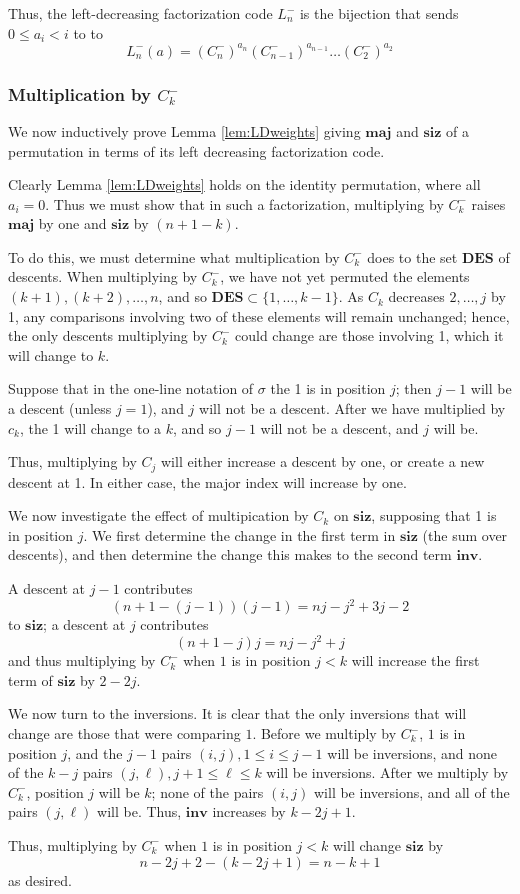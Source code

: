 \documentclass{amsart}[12pt]
\theoremstyle{definition}
\newcommand{\inv}{\mathbf{inv}}
\newcommand{\DES}{\mathbf{DES}}
\newcommand{\maj}{\mathbf{maj}}
\newcommand{\siz}{\mathbf{siz}}
\begin{document}
Thus, the left-decreasing factorization code $L^-_n$ is the bijection that sends $0\leq a_i<i$ to to 
$$L^-_n(a)=(C_n^-)^{a_n}(C_{n-1}^-)^{a_{n-1}}\dots (C_2^-)^{a_2}$$


\subsubsection{Multiplication by $C_k^-$} \label{sec:factorizationinductuction}

We now inductively prove Lemma \ref{lem:LDweights} giving $\maj$ and $\siz$ of a permutation in terms of its left decreasing factorization code.

Clearly Lemma \ref{lem:LDweights} holds on the identity permutation, where all $a_i=0$.   Thus we must show that in such a factorization, multiplying by $C^-_k$ raises $\maj$ by one and $\siz$ by $(n+1-k)$.

To do this, we must determine what multiplication by $C_k^-$ does to the set $\DES$ of descents.  When multiplying by $C^-_k$, we have not yet permuted the elements $(k+1), (k+2),\dots, n$, and so $\DES\subset \{1,\dots, k-1\}$. As $C_k$ decreases $2,\dots, j$ by 1, any comparisons involving two of these elements will remain unchanged; hence, the only descents multiplying by $C^-_k$ could change are those involving 1, which it will change to $k$.

Suppose that in the one-line notation of $\sigma$ the 1 is in position $j$; then $j-1$ will be a descent (unless $j=1$), and $j$ will not be a descent.  After we have multiplied by $c_k$, the 1 will change to a $k$, and so $j-1$ will not be a descent, and $j$ will be.

Thus, multiplying by $C_j$ will either increase a descent by one, or create a new descent at 1.  In either case, the major index will increase by one.

We now investigate the effect of multipication by $C_k$ on $\siz$, supposing that 1 is in position $j$.  We first determine the change in the first term in $\siz$ (the sum over descents), and then determine the change this makes to the second term $\inv$.

A descent at $j-1$ contributes $$(n+1-(j-1))(j-1)=nj-j^2+3j-2$$ to $\siz$; a descent at $j$ contributes $$(n+1-j)j=nj-j^2+j$$
and thus multiplying by $C_k^-$ when $1$ is in position $j<k$ will increase the first term of $\siz$ by $2-2j$.

We now turn to the inversions.  It is clear that the only inversions that will change are those that were comparing $1$.  Before we multiply by $C_k^-$, $1$ is in position $j$, and the $j-1$ pairs $(i,j), 1\leq i \leq j-1$  will be inversions, and none of the $k-j$ pairs $(j,\ell), j+1\leq \ell \leq k$ will be inversions.  After we multiply by $C_k^-$, position $j$ will be $k$; none of the pairs $(i,j)$ will be inversions, and all of the pairs $(j,\ell)$ will be.  Thus, $\inv$ increases by $k-2j+1$.  

Thus, multiplying by $C_k^-$ when $1$ is in position $j<k$ will change $\siz$ by $$n-2j+2-(k-2j+1)=n-k+1$$ as desired.




  









\end{document}
